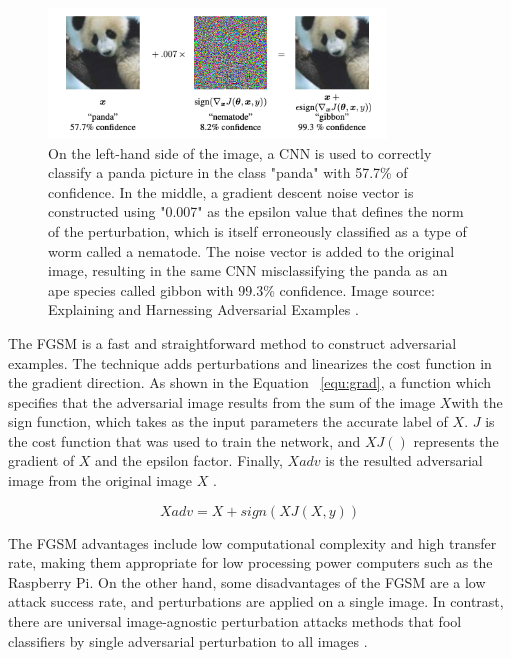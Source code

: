 \documentclass[12pt]{article}
\begin{document}
\begin{figure} [!ht] %
\begin{center}
\includegraphics[width=0.8\textwidth]{figures/goodfellow-fgsm.png}
\caption{ On the left-hand side of the image, a CNN is used to correctly classify a panda picture in the class "panda" with 57.7\% of confidence. In the middle, a gradient descent noise vector is constructed using "0.007" as the epsilon value that defines the norm of the perturbation, which is itself erroneously classified as a type of worm called a nematode. The noise vector is added to the original image, resulting in the same CNN misclassifying the panda as an ape species called gibbon with 99.3\% confidence. Image source: Explaining and Harnessing Adversarial Examples \parencite{Goodfellow}.}
\label{fig:fgsmpanda}
\end{center}
\end{figure}
The FGSM is a fast and straightforward method to construct adversarial examples. The technique adds perturbations and linearizes the cost function in the gradient direction. As shown in the Equation ~\ref{equ:grad}, a function which specifies that the adversarial image results from the sum of the image \(X \)with the sign function, which takes as the input parameters the accurate label of \(X\). \(J\) is the cost function that was used to train the network, and \(X J()\) represents the gradient of \(X\) and the epsilon factor. Finally, \(Xadv\) is the resulted adversarial image from the original image \(X\)
 \parencite{changli}.
 \begin{center}
\begin{equation}
Xadv = X + sign(X J(X, y))
\label{equ:grad}
\end{equation}
\end{center}

The FGSM advantages include low computational complexity and high transfer rate, making them appropriate for low processing power computers such as the Raspberry Pi. On the other hand, some disadvantages of the FGSM are a low attack success rate, and perturbations are applied on a single image. In contrast, there are universal image-agnostic perturbation attacks methods that fool classifiers by single adversarial perturbation to all images \parencite{changli}.
\end{document}
